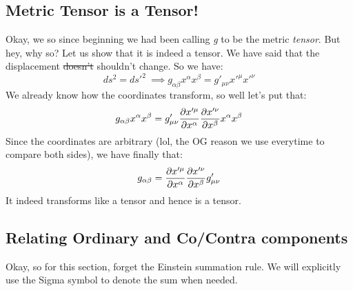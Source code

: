 \subsection{Metric Tensor is a Tensor!}
Okay, we so since beginning we had been calling \textit{g} to be the metric \textit{tensor}. But hey, why so? Let us show that it is indeed a tensor. We have said that the displacement \sout{doesn't} shouldn't change. So we have:
$$ds^2 = ds'^2 \ \implies g_{\alpha \beta}x^\alpha x^\beta =  g'_{\mu \nu}x'^\mu x'^\nu$$
We already know how the coordinates transform, so well let's put that:
$$g_{\alpha \beta}x^\alpha x^\beta =  g'_{\mu\nu}\pdv{x'^\mu}{x^\alpha} \pdv{x'^\nu}{x^\beta} x^\alpha x^\beta$$
Since the coordinates are arbitrary (lol, the OG reason we use everytime to compare both sides), we have finally that:
$$g_{\alpha \beta} = \pdv{x'^\mu}{x^\alpha} \pdv{x'^\nu}{x^\beta}g'_{\mu\nu}$$
It indeed transforms like a tensor and hence is a tensor. 
\subsection{Relating Ordinary and Co/Contra components}
Okay, so for this section, forget the Einstein summation rule. We will explicitly use the Sigma  symbol to denote the sum when needed. \\[0.3cm]

